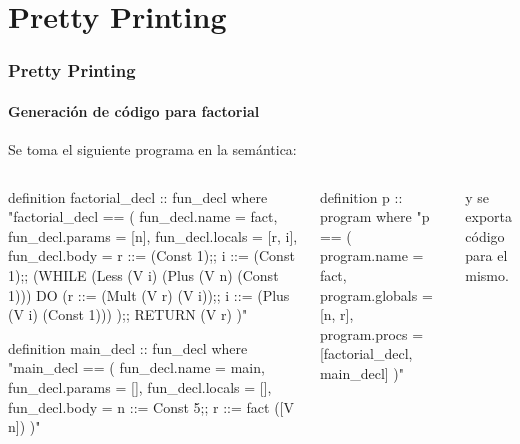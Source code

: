 \section{Pretty Printing}

\begin{frame}[fragile]
\frametitle{Pretty Printing}
\framesubtitle{Generación de código para factorial}
\Fontvi

Se toma el siguiente programa en la semántica:

\begin{columns}[t]
\begin{semiverbatim}
definition factorial_decl :: fun_decl
  where "factorial_decl ==
    ( fun_decl.name = fact,
      fun_decl.params = [n],
      fun_decl.locals = [r, i],
      fun_decl.body =
        r ::= (Const 1);;
        i ::= (Const 1);;
        (WHILE (Less (V i) (Plus (V n) (Const 1))) DO
          (r ::= (Mult (V r) (V i));;
          i ::= (Plus (V i) (Const 1)))
        );;
        RETURN (V r)
    )"

definition main_decl :: fun_decl
  where "main_decl ==
    ( fun_decl.name = main,
      fun_decl.params = [],
      fun_decl.locals = [],
      fun_decl.body =
        n ::= Const 5;;
        r ::= fact ([V n])
    )"
\end{semiverbatim}
\begin{semiverbatim}
definition p :: program
  where "p ==
    ( program.name = fact,
      program.globals = [n, r],
      program.procs = [factorial_decl, main_decl]
    )"
\end{semiverbatim}

y se exporta código para el mismo.
\end{columns}


\end{frame}


